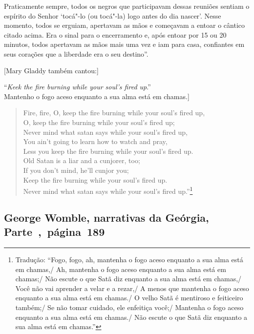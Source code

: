 Praticamente sempre, todos os negros que participavam dessas reuniões
sentiam o espírito do Senhor `tocá"-lo (ou tocá"-la) logo antes do dia
nascer'. Nesse momento, todos se erguiam, apertavam as mãos e começavam
a entoar o cântico citado acima. Era o sinal para o encerramento e, após
entoar por 15 ou 20 minutos, todos apertavam as mãos mais uma vez e iam
para casa, confiantes em seus corações que a liberdade era o seu
destino''.

{[}Mary Gladdy também cantou:{]}

\noindent{}``\emph{Keek the fire burning while your soul's fired up}.''\\
\noindent{}{[}Mantenho o fogo aceso enquanto a sua alma está em chamas.{]}

\begin{verse}
Fire, fire, O, keep the fire burning while your \qb{}soul's fired up,\\
O, keep the fire burning while your soul's \qb{}fired up;\\
Never mind what satan says while your \qb{}soul's fired up,\\
You ain't going to learn how to watch and \qb{}pray,\\
Less you keep the fire burning while your \qb{}soul's fired up.\\
Old Satan is a liar and a cunjorer, too;\\
If you don't mind, he'll cunjor you;\\
Keep the fire burning while your soul's fired \qb{}up.\\ 
Never mind what satan says while your \qb{}soul's fired up.''\footnote{Tradução: ``Fogo, fogo, ah, mantenha o fogo aceso enquanto a sua alma está em
chamas,/ Ah, mantenha o
fogo aceso enquanto a sua alma está em chamas;/ Não escute o
que Satã diz enquanto a sua alma está em chamas,/ Você não vai aprender
a velar e a rezar,/ A menos
que mantenha o fogo aceso enquanto a sua alma está em chamas./ O velho Satã é mentiroso e
feiticeiro também;/ Se não tomar cuidado, ele
enfeitiça você;/ Mantenha o fogo
aceso enquanto a sua alma está em chamas./ Não escute o
que Satã diz enquanto a sua alma está em chamas.''}
\end{verse}

\subsection{George Womble, narrativas da Geórgia, Parte~,~página~189}
\label{ref309}

